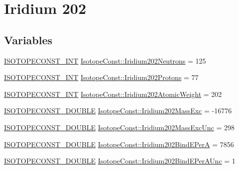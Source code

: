 \hypertarget{group___isotope_const-_iridium-_ir202}{}\section{Iridium 202}
\label{group___isotope_const-_iridium-_ir202}
\subsection*{Variables}
\begin{DoxyCompactItemize}
\item 
\mbox{\hyperlink{group___isotope_const-_macros_ga5f18360b3e99483a35c32d789e62621c}{I\+S\+O\+T\+O\+P\+E\+C\+O\+N\+S\+T\+\_\+\+I\+NT}} \mbox{\hyperlink{group___isotope_const-_iridium-_ir202_gab21cd0bd51d125b4536dd6b1cde37fde}{Isotope\+Const\+::\+Iridium202\+Neutrons}} = 125
\item 
\mbox{\hyperlink{group___isotope_const-_macros_ga5f18360b3e99483a35c32d789e62621c}{I\+S\+O\+T\+O\+P\+E\+C\+O\+N\+S\+T\+\_\+\+I\+NT}} \mbox{\hyperlink{group___isotope_const-_iridium-_ir202_gaf37b2518ad8d0ba9faad4587b93efe15}{Isotope\+Const\+::\+Iridium202\+Protons}} = 77
\item 
\mbox{\hyperlink{group___isotope_const-_macros_ga5f18360b3e99483a35c32d789e62621c}{I\+S\+O\+T\+O\+P\+E\+C\+O\+N\+S\+T\+\_\+\+I\+NT}} \mbox{\hyperlink{group___isotope_const-_iridium-_ir202_ga9ab5e9c8006985bad19f5ed3f385455e}{Isotope\+Const\+::\+Iridium202\+Atomic\+Weight}} = 202
\item 
\mbox{\hyperlink{group___isotope_const-_macros_ga8f45a7272ce02c0b4c65c44636ed719a}{I\+S\+O\+T\+O\+P\+E\+C\+O\+N\+S\+T\+\_\+\+D\+O\+U\+B\+LE}} \mbox{\hyperlink{group___isotope_const-_iridium-_ir202_gadda7aaddedcda173a2e64ee8d594ca1c}{Isotope\+Const\+::\+Iridium202\+Mass\+Exc}} = -\/16776
\item 
\mbox{\hyperlink{group___isotope_const-_macros_ga8f45a7272ce02c0b4c65c44636ed719a}{I\+S\+O\+T\+O\+P\+E\+C\+O\+N\+S\+T\+\_\+\+D\+O\+U\+B\+LE}} \mbox{\hyperlink{group___isotope_const-_iridium-_ir202_ga763b84dabc213c9c9059bdbda211eec0}{Isotope\+Const\+::\+Iridium202\+Mass\+Exc\+Unc}} = 298
\item 
\mbox{\hyperlink{group___isotope_const-_macros_ga8f45a7272ce02c0b4c65c44636ed719a}{I\+S\+O\+T\+O\+P\+E\+C\+O\+N\+S\+T\+\_\+\+D\+O\+U\+B\+LE}} \mbox{\hyperlink{group___isotope_const-_iridium-_ir202_ga4c242b1a3e8b8390febd2e43ae174e65}{Isotope\+Const\+::\+Iridium202\+Bind\+E\+PerA}} = 7856
\item 
\mbox{\hyperlink{group___isotope_const-_macros_ga8f45a7272ce02c0b4c65c44636ed719a}{I\+S\+O\+T\+O\+P\+E\+C\+O\+N\+S\+T\+\_\+\+D\+O\+U\+B\+LE}} \mbox{\hyperlink{group___isotope_const-_iridium-_ir202_gae593c342a84950b45beb63f2ff722bfb}{Isotope\+Const\+::\+Iridium202\+Bind\+E\+Per\+A\+Unc}} = 1

\end{DoxyCompactItemize}
